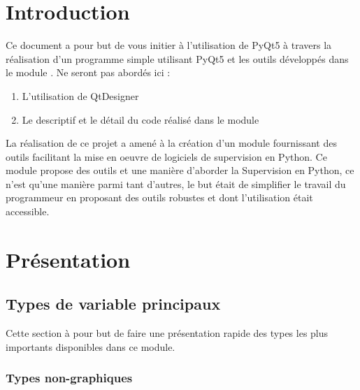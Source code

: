 \chapter{Introduction}

Ce document a pour but de vous initier à l'utilisation de PyQt5 à travers la réalisation d'un programme simple utilisant PyQt5 et les outils développés dans le module .\newline
Ne seront pas abordés ici :
\begin{enumerate}
\item L'utilisation de QtDesigner
\item Le descriptif et le détail du code réalisé dans le module 
\end{enumerate}

\smallSkip
La réalisation de ce projet a amené à la création d'un module  fournissant des outils facilitant la mise en oeuvre de logiciels de supervision en Python.\newline
Ce module propose des outils et une manière d'aborder la Supervision en Python, ce n'est qu'une manière parmi tant d'autres, le but était de simplifier le travail du programmeur en proposant des outils robustes et dont l'utilisation était accessible.





\chapter{Présentation}

\section{Types de variable principaux}

Cette section à pour but de faire une présentation rapide des types les plus importants disponibles dans ce module.

\subsection{Types non-graphiques}

